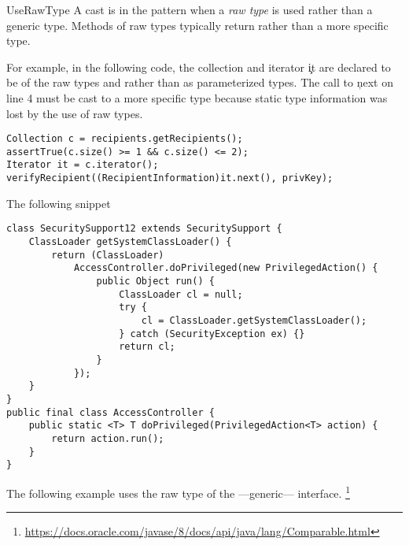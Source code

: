 \begin{pattern}{UseRawType}
A cast is in the \thisp{} pattern when a \emph{raw type} is used rather than a generic type.
Methods of raw types typically return  rather than a more specific type.

\instances{}
For example, in the following code,%
\def\urlvar{http://bit.ly/bcgit_bc_java_2SD2HLm}
the collection  and iterator \c{it} are declared to be of the raw types  and  rather than as parameterized types.
The call to \c{next} on line 4 must be cast to a more specific type because static type information was lost by the use of raw types.

\begin{verbatim}
Collection c = recipients.getRecipients();
assertTrue(c.size() >= 1 && c.size() <= 2);
Iterator it = c.iterator();
verifyRecipient((RecipientInformation)it.next(), privKey);
\end{verbatim}

The following snippet%
\def\urlvar{http://bit.ly/robovm_robovm_2FAI5x5}

\begin{verbatim}
class SecuritySupport12 extends SecuritySupport {
    ClassLoader getSystemClassLoader() {
        return (ClassLoader)
            AccessController.doPrivileged(new PrivilegedAction() {
                public Object run() {
                    ClassLoader cl = null;
                    try {
                        cl = ClassLoader.getSystemClassLoader();
                    } catch (SecurityException ex) {}
                    return cl;
                }
            });
    }
}
public final class AccessController {
    public static <T> T doPrivileged(PrivilegedAction<T> action) {
        return action.run();
    }
}
\end{verbatim}

The following example%
\def\urlvar{http://bit.ly/fangjie008_tiexue_mcp_parent_2FSZKzm}
uses the raw type of the  ---generic--- interface.%
\footnote{\url{https://docs.oracle.com/javase/8/docs/api/java/lang/Comparable.html}}


\end{pattern}
